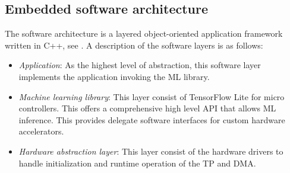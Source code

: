 \subsection{Embedded software architecture}
The software architecture is a layered object-oriented application framework written in C++, see . A description of the software layers is as follows:
\begin{itemize}
	\item \emph{Application}: As the highest level of abstraction, this software layer implements the application invoking the ML library.
	\item \emph{Machine learning library}: This layer consist of TensorFlow Lite for micro controllers. This offers a comprehensive high level API that allows ML inference. This provides delegate software interfaces for custom hardware accelerators.
	\item \emph{Hardware abstraction layer}: This layer consist of the hardware drivers to handle initialization and runtime operation of the TP and DMA.
\end{itemize}